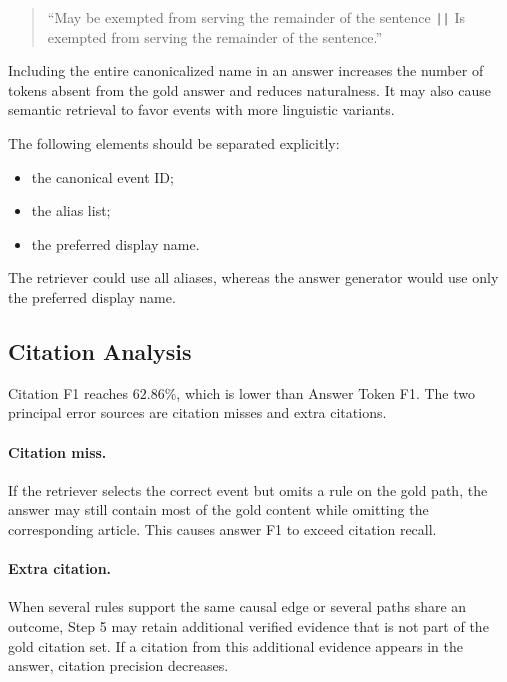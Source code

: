 \begin{quote}
``May be exempted from serving the remainder of the sentence
\texttt{||}
Is exempted from serving the remainder of the sentence.''
\end{quote}

Including the entire canonicalized name in an answer increases the number of
tokens absent from the gold answer and reduces naturalness. It may also
cause semantic retrieval to favor events with more linguistic variants.

The following elements should be separated explicitly:

\begin{itemize}
    \item the canonical event ID;
    \item the alias list;
    \item the preferred display name.
\end{itemize}

The retriever could use all aliases, whereas the answer generator would use
only the preferred display name.

\subsection{Citation Analysis}

Citation F1 reaches \(62.86\%\), which is lower than Answer Token F1. The
two principal error sources are citation misses and extra citations.

\paragraph{Citation miss.}

If the retriever selects the correct event but omits a rule on the gold path,
the answer may still contain most of the gold content while omitting the
corresponding article. This causes answer F1 to exceed citation recall.

\paragraph{Extra citation.}

When several rules support the same causal edge or several paths share an
outcome, Step 5 may retain additional verified evidence that is not part of
the gold citation set. If a citation from this additional evidence appears
in the answer, citation precision decreases.

